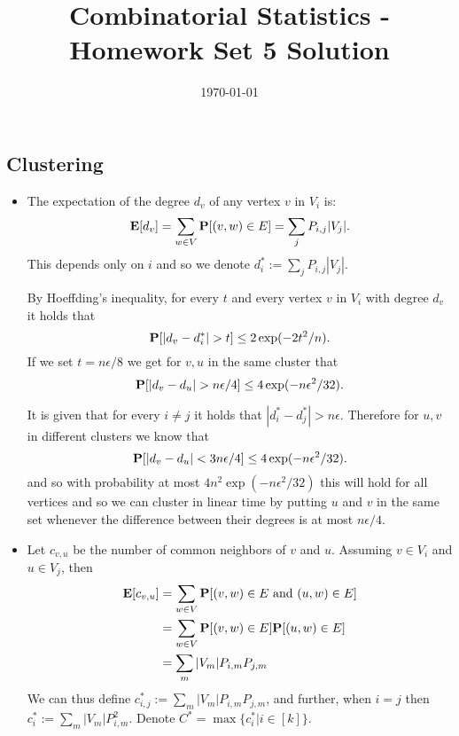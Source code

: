 \documentclass[11pt]{article} \usepackage{amssymb}
\newcommand{\E}{{\bf E}} \newcommand{\Cov}{{\bf Cov}}
\newcommand{\eps}{\epsilon} \newcommand{\lam}{\lambda}
\begin{document}
\title{Combinatorial Statistics - Homework Set 5 Solution}

\date{\today}
\maketitle
\subsection{Clustering}
\begin{itemize}
\item The expectation of the degree $d_v$ of any vertex $v$ in $V_i$ is:
  \begin{equation*}
    \E[d_v]=\sum_{w \in V}\P[(v,w)\in E]=\sum_jP_{i,j}|V_j|.
  \end{equation*}
  This depends only on $i$ and so we denote $d_i^\ast:=\sum_jP_{i,j}|V_j|$.
  
  By Hoeffding's inequality, for every $t$ and every vertex $v$ in
  $V_i$ with degree $d_v$ it holds that
  \begin{equation*}
    \P[|d_v-d_i^\ast|>t] \leq 2\exp(-2t^2/n).
  \end{equation*}
  If we set $t=n\eps/8$ we get for $v,u$ in the same cluster that
  \begin{equation*}
    \P[|d_v-d_u|>n\eps/4] \leq 4\exp(-n\eps^2/32).
  \end{equation*}
  
  It is given that for every $i \neq j$ it holds that
  $|d_i^\ast-d_j^\ast|>n\eps$. Therefore for $u,v$ in different
  clusters we know that
  \begin{equation*}
    \P[|d_v-d_u|<3n\eps/4] \leq 4\exp(-n\eps^2/32).
  \end{equation*}
  and so with probability at most  $4n^2\exp(-n\eps^2/32)$ this will
  hold for all vertices and so we can cluster in linear time by
  putting $u$ and $v$ in the same set whenever the difference
  between their degrees is at most $n\eps/4$.

\item
  Let $c_{v,u}$ be the number of common neighbors of $v$ and
  $u$. Assuming $v \in V_i$ and $u \in V_j$, then
  \begin{align*}
    \E[c_{v,u}]&=\sum_{w \in V}\P[(v,w) \in E\mbox{ and } (u,w) \in E]
    \\ &=\sum_{w \in V}\P[(v,w) \in E]\P[(u,w) \in E]
    \\ &=\sum_m|V_m|P_{i,m}P_{j,m}
  \end{align*}
  We can thus define $c_{i,j}^\ast:=\sum_m|V_m|P_{i,m}P_{j,m}$, and further,
  when $i=j$ then $c_i^\ast:=\sum_m|V_m|P_{i,m}^2$. Denote
  $C^\ast=\max\{c_i^\ast|i \in [k]\}$.


\end{itemize}
\end{document}
